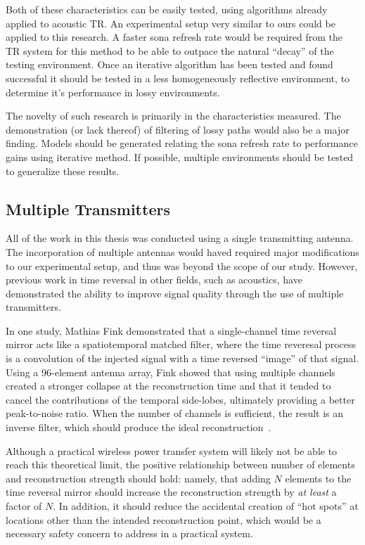 Both of these characteristics can be easily tested, using algorithms already applied to acoustic TR. An experimental setup very similar to ours could be applied to this research. A faster sona refresh rate would be required from the TR system for this method to be able to outpace the natural ``decay'' of the testing environment. Once an iterative algorithm has been tested and found successful it should be tested in a less homogeneously reflective environment, to determine it's performance in lossy environments.

The novelty of such research is primarily in the characteristics measured. The demonstration (or lack thereof) of filtering of lossy paths would also be a major finding. Models should be generated relating the sona refresh rate to performance gains using iterative method. If possible, multiple environments should be tested to generalize these results.

\subsection{Multiple Transmitters}

All of the work in this thesis was conducted using a single transmitting antenna. The incorporation of multiple antennas would haved required major modifications to our experimental setup, and thus was beyond the scope of our study. However, previous work in time reversal in other fields, such as acoustics, have demonstrated the ability to improve signal quality through the use of multiple transmitters.

In one study, Mathias Fink demonstrated that a single-channel time reversal mirror acts like a spatiotemporal matched filter, where the time reveresal process is a convolution of the injected signal with a time reversed ``image'' of that signal. Using a 96-element antenna array, Fink showed that using multiple channels created a stronger collapse at the reconstruction time and that it tended to cancel the contributions of the temporal side-lobes, ultimately providing a better peak-to-noise ratio. When the number of channels is sufficient, the result is an inverse filter, which should produce the ideal reconstruction~\cite{fink-multi-channel}.

Although a practical wireless power transfer system will likely not be able to reach this theoretical limit, the positive relationship between number of elements and reconstruction strength should hold: namely, that adding $N$ elements to the time reversal mirror should increase the reconstruction strength by \textit{at least} a factor of $N$. In addition, it should reduce the accidental creation of ``hot spots'' at locations other than the intended reconstruction point, which would be a necessary safety concern to address in a practical system.

